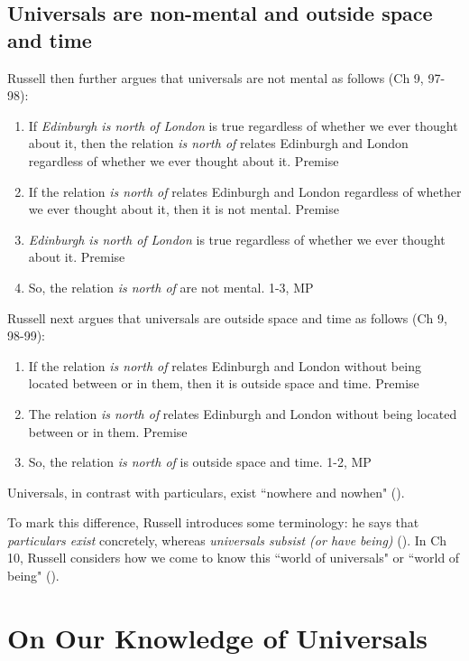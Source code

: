 \documentclass[oneside,letterpaper,12pt]{book}
\begin{document}
\section*{Universals are non-mental and outside space and time}
Russell then further argues that universals are not mental as follows (Ch 9, 97-98):
\begin{enumerate}%
	\item If \textit{Edinburgh is north of London} is true regardless of whether we ever thought about it, then the relation \textit{is north of} relates Edinburgh and London regardless of whether we ever thought about it. \hfill Premise
	\item If the relation \textit{is north of} relates Edinburgh and London regardless of whether we ever thought about it, then it is not mental. \hfill Premise
	\item \textit{Edinburgh is north of London} is true regardless of whether we ever thought about it. \hfill Premise
	\item So, the relation \textit{is north of} are not mental. \hfill 1-3, MP
\end{enumerate}
Russell next argues that universals are outside space and time as follows (Ch 9, 98-99):
\begin{enumerate}%
	\item If the relation \textit{is north of} relates Edinburgh and London without being located between or in them, then it is outside space and time. \hfill Premise
	\item The relation \textit{is north of} relates Edinburgh and London without being located between or in them. \hfill Premise
	\item So, the relation \textit{is north of} is outside space and time. \hfill 1-2, MP
\end{enumerate}
Universals, in contrast with particulars, exist ``nowhere and nowhen" (\pageref{nowhereandnowhen}). 

To mark this difference, Russell introduces some terminology: he says that \textit{particulars exist} concretely, whereas \textit{universals subsist (or have being)} (\pageref{subsist}). In Ch 10, Russell considers how we come to know this ``world of universals" or ``world of being" (\pageref{subsist}).

\hypertarget{chapter-x.-on-our-knowledge-of-universals}{%
\chapter{On Our Knowledge of Universals}\label{chapter-x.-on-our-knowledge-of-universals}}
\end{document}
